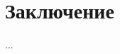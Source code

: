 \documentclass[../document.tex]{subfiles}
\begin{document}
    \section*{Заключение}
    \par ...
\end{document}
